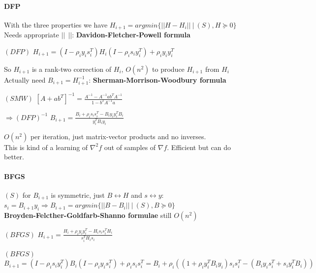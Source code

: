 \documentclass[10pt]{report}
\begin{document}
\paragraph{DFP} With the three properties we have $H_{i+1} = argmin\{||H-H_i||\:|\:(S), H\succeq 0\}$\\
Needs appropriate $||\:\:||$: \textbf{Davidon-Fletcher-Powell formula}
\begin{list}{}{}
	\item[$(DFP)$] $H_{i+1} = (I - \rho_iy_is_i^T)H_i(I-\rho_is_iy_i^T)+\rho_iy_iy_i^T$
\end{list}
So $H_{i+1}$ is a rank-two correction of $H_i$, $O(n^2)$ to produce $H_{i+1}$ from $H_i$\\
Actually need $B_{i+1} = H_{i+1}^{-1}$: \textbf{Sherman-Morrison-Woodbury formula}
\begin{list}{}{}
	\item[$(SMW)$] $[A+ab^T]^{-1} = \frac{A^{-1} - A^{-1}ab^TA^{-1}}{1-b^TA^{-1}a}$
	\item[$\Rightarrow (DFP)^{-1}$] $B_{i+1} = \frac{B_i + \rho_is_is_i^T - B_iy_iy_i^TB_i}{y_i^TB_iy_i}$
\end{list}
$O(n^2)$ per iteration, just matrix-vector products and no inverses.\\
This is kind of a learning of $\nabla^2 f$ out of samples of $\nabla f$. Efficient but can do better.
\paragraph{BFGS} $(S)$ for $B_{i+1}$ is symmetric, just $B \leftrightarrow H$ and $s \leftrightarrow y$: $s_i = B_{i+1}y_i \Rightarrow B_{i+1} = argmin\{||B-B_i||\:|\:(S),B\succeq 0\}$\\
\textbf{Broyden-Felcther-Goldfarb-Shanno formulae} still $O(n^2)$\begin{list}{}{}
	\item[$(BFGS)$] $H_{i+1} = \frac{H_i + \rho_iy_iy_i^T - H_is_is_i^TH_i}{s_i^TH_is_i}$
	\item[$(BFGS)$] $B_{i+1} = (I-\rho_is_iy_i^T)B_i(I-\rho_iy_is_i^T)+\rho_is_is_i^T = B_i+\rho_i((1+\rho_iy_i^TB_iy_i)s_is_i^T - (B_iy_is_i^T+s_iy_i^TB_i))$
\end{list}
\end{document}

